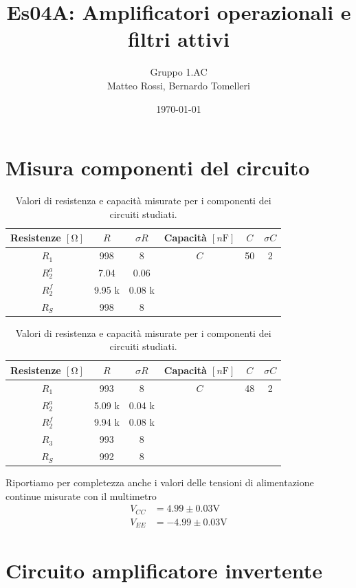 \documentclass[10pt,a4paper]{article}
\author{Gruppo 1.AC \\ Matteo Rossi, Bernardo Tomelleri}
\title{Es04A: Amplificatori operazionali e filtri attivi}
\begin{document}
\date{\today}
\maketitle

\setcounter{section}{0}

\section*{Misura componenti del circuito}
\begin{table}[ht]
\centering
\begin{tabular}{cccccc}
\toprule
Resistenze $[\si{\ohm}]$ & $R$ & $\sigma R$ & Capacità $[\si{n\F}]$ & $C$ &
$\sigma C$ \\
\midrule
\midrule
$R_1$	  & 998 	& 8 	 & $C$ & 50			 & 2 \\
$R_2^a$	  & 7.04	& 0.06 	 & & &	\\
$R_2^f$	  & 9.95 k	& 0.08 k & & &	\\
$R_S$	  & 998		& 8		 & & &	\\
\bottomrule     
\end{tabular}
\caption{Valori di resistenza e capacità misurate per i componenti dei
circuiti studiati. \label{tab: rcmes_M}}

\begin{tabular}{cccccc}
\toprule
Resistenze $[\si{\ohm}]$ & $R$ & $\sigma R$ & Capacità $[\si{n\F}]$ & $C$ &
$\sigma C$ \\
\midrule
\midrule
$R_1$	  & 993 	& 8 	 & $C$ & 48			 & 2 \\
$R_2^a$	  & 5.09 k	& 0.04 k 	 & & &	\\
$R_2^f$	  & 9.94 k		& 0.08 k & 		& 		 &	\\
$R_3$	  & 993		& 8		 &				&				 &		\\
$R_S$	  & 992		& 8		 &				&				 &		\\
\bottomrule     
\end{tabular}
\caption{Valori di resistenza e capacità misurate per i componenti dei
circuiti studiati. \label{tab: rcmes_B}}
\end{table}
Riportiamo per completezza anche i valori delle tensioni di alimentazione
continue misurate con il multimetro
\begin{align*}
V_{CC} &= 4.99 \pm 0.03 \si{\V} \\
V_{EE} &= -4.99 \pm 0.03 \si{\V}
\end{align*}

\section{Circuito amplificatore invertente}
\end{document}

